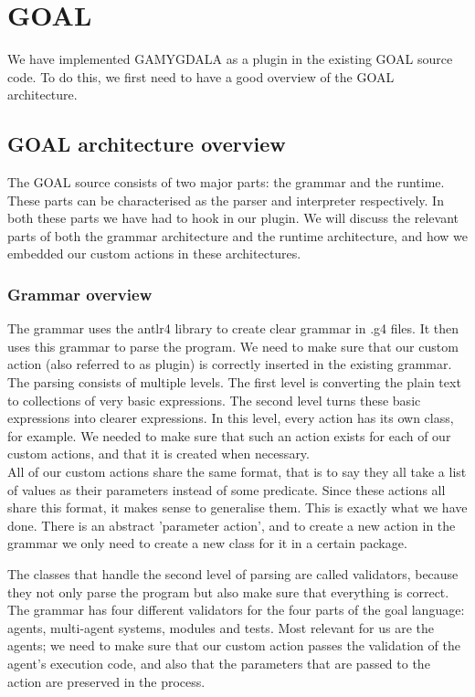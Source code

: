 \section{GOAL}
We have implemented GAMYGDALA as a plugin in the existing GOAL source code. To do this, we first need to have a good overview of the GOAL architecture.

\subsection{GOAL architecture overview}
The GOAL source consists of two major parts: the grammar and the runtime. These parts can be characterised as the parser and interpreter respectively. In both these parts we have had to hook in our plugin. We will discuss the relevant parts of both the grammar architecture and the runtime architecture, and how we embedded our custom actions in these architectures.

\subsubsection{Grammar overview} 
The grammar uses the antlr4 library to create clear grammar in .g4 files. It then uses this grammar to parse the program. We need to make sure that our custom action (also referred to as plugin) is correctly inserted in the existing grammar. \\ 

The parsing consists of multiple levels. The first level is converting the plain text to collections of very basic expressions. The second level turns these basic expressions into clearer expressions. In this level, every action has its own class, for example. We needed to make sure that such an action exists for each of our custom actions, and that it is created when necessary. \\

All of our custom actions share the same format, that is to say they all take a list of values as their parameters instead of some predicate. Since these actions all share this format, it makes sense to generalise them. This is exactly what we have done. There is an abstract 'parameter action', and to create a new action in the grammar we only need to create a new class for it in a certain package. 

The classes that handle the second level of parsing are called validators, because they not only parse the program but also make sure that everything is correct. The grammar has four different validators for the four parts of the goal language: agents, multi-agent systems, modules and tests. Most relevant for us are the agents; we need to make sure that our custom action passes the validation of the agent's execution code, and also that the parameters that are passed to the action are preserved in the process. 

